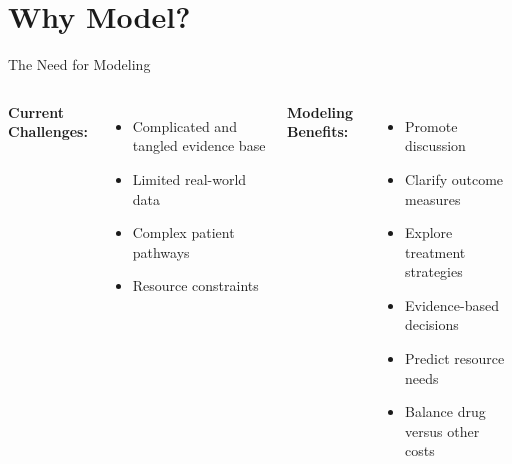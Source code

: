 \documentclass[10pt,aspectratio=169]{beamer}
\begin{document}

{
\section{Why Model?}
}

\begin{frame}{The Need for Modeling}
\begin{columns}[T]
\textbf{Current Challenges:}
\begin{itemize}
    \item Complicated and tangled evidence base
    \item Limited real-world data
    \item Complex patient pathways
    \item Resource constraints
\end{itemize}

\textbf{Modeling Benefits:}
\begin{itemize}
    \item Promote discussion
    \item Clarify outcome measures
    \item Explore treatment strategies
    \item Evidence-based decisions
    \item Predict resource needs
    \item Balance drug versus other costs
\end{itemize}
\end{columns}
\end{frame}
\end{document}
